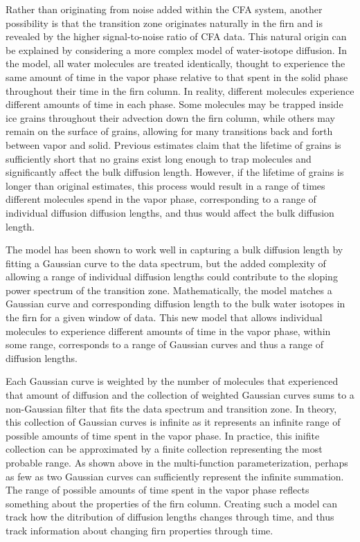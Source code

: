 \documentclass[draft, jgrga]{AGUTeX}
\begin{document}
\begin{article}
Rather than originating from noise added within the CFA system, another possibility is that the transition zone originates naturally in the firn and is revealed by the higher signal-to-noise ratio of CFA data. This natural origin can be explained by considering a more complex model of water-isotope diffusion. In the \citet{Johnsen2000} model, all water molecules are treated identically, thought to experience the same amount of time in the vapor phase relative to that spent in the solid phase throughout their time in the firn column. In reality, different molecules experience different amounts of time in each phase. Some molecules may be trapped inside ice grains throughout their advection down the firn column, while others may remain on the surface of grains, allowing for many transitions back and forth between vapor and solid. Previous estimates \citep{Whillans1985, Johnsen2000} claim that the lifetime of grains is sufficiently short that no grains exist long enough to trap molecules and significantly affect the bulk diffusion length. However, if the lifetime of grains is longer than original estimates, this process would result in a range of times different molecules spend in the vapor phase, corresponding to a range of individual diffusion diffusion lengths, and thus would affect the bulk diffusion length.

The \citet{Johnsen2000} model has been shown to work well in capturing a bulk diffusion length by fitting a Gaussian curve to the data spectrum, but the added complexity of allowing a range of individual diffusion lengths could contribute to the sloping power spectrum of the transition zone. Mathematically, the \citet{Johnsen2000} model matches a Gaussian curve and corresponding diffusion length to the bulk water isotopes in the firn for a given window of data. This new model that allows individual molecules to experience different amounts of time in the vapor phase, within some range, corresponds to a range of Gaussian curves and thus a range of diffusion lengths.

Each Gaussian curve is weighted by the number of molecules that experienced that amount of diffusion and the collection of weighted Gaussian curves sums to a non-Gaussian filter that fits the data spectrum and transition zone. In theory, this collection of Gaussian curves is infinite as it represents an infinite range of possible amounts of time spent in the vapor phase. In practice, this inifite collection can be approximated by a finite collection representing the most probable range. As shown above in the multi-function parameterization, perhaps as few as two Gaussian curves can sufficiently represent the infinite summation. The range of possible amounts of time spent in the vapor phase reflects something about the properties of the firn column. Creating such a model can track how the ditribution of diffusion lengths changes through time, and thus track information about changing firn properties through time.


\end{article}
\end{document}
